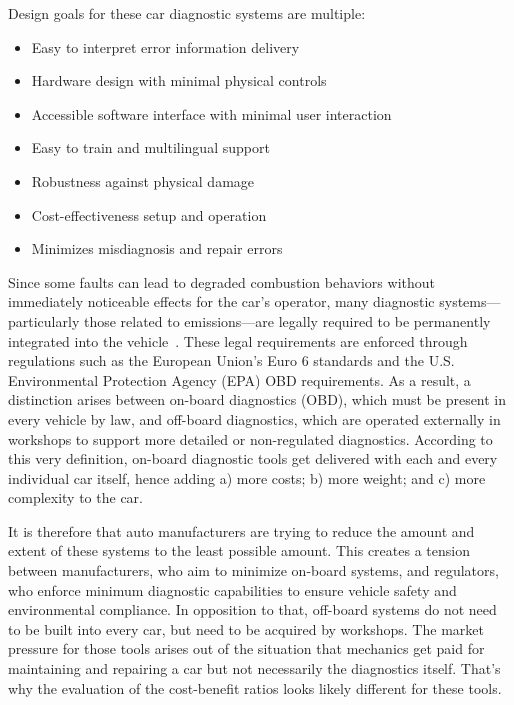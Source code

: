Design goals for these car diagnostic systems are multiple:
\begin{itemize}
  \item Easy to interpret error information delivery
  \item Hardware design with minimal physical controls
  \item Accessible software interface with minimal user interaction
  \item Easy to train and multilingual support
  \item Robustness against physical damage
  \item Cost-effectiveness setup and operation
  \item Minimizes misdiagnosis and repair errors
\end{itemize}
Since some faults can lead to degraded combustion behaviors without immediately noticeable effects for the car’s operator, 
many diagnostic systems—particularly those related to emissions—are legally required to be permanently integrated into the vehicle~\cite{obd-regulations, epa-obd}. 
These legal requirements are enforced through regulations such as the European Union’s Euro 6 standards and the U.S. Environmental Protection Agency (EPA) OBD requirements. 
As a result, a distinction arises between on-board diagnostics (OBD), which must be present in every vehicle by law, and off-board diagnostics, 
which are operated externally in workshops to support more detailed or non-regulated diagnostics.
According to this very definition, on-board diagnostic tools get delivered with each and every individual car itself, hence adding a) more costs; b) more weight; and c) more complexity to the car.

It is therefore that auto manufacturers are trying to reduce the amount and extent of these systems to the least possible amount. 
This creates a tension between manufacturers, who aim to minimize on-board systems, and regulators, who enforce minimum diagnostic capabilities to ensure vehicle safety and environmental compliance.
In opposition to that, off-board systems do not need to be built into every car, but need to be acquired by workshops. 
The market pressure for those tools arises out of the situation that mechanics get paid for maintaining and repairing a car but not necessarily the diagnostics itself. 
That’s why the evaluation of the cost-benefit ratios looks likely different for these tools.

